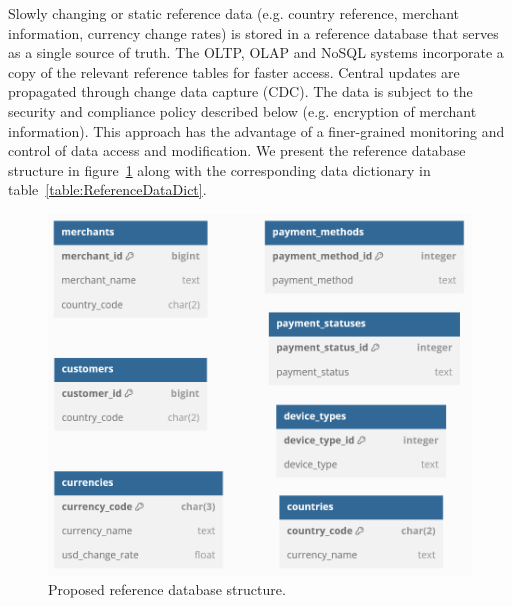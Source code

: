 \documentclass[11pt,a4paper,computermodern]{article}
\begin{document}
Slowly changing or static reference data (e.g. country reference, merchant information, currency change rates) is stored in a reference database that serves as a single source of truth. The OLTP, OLAP and NoSQL systems incorporate a copy of the relevant reference tables for faster access. Central updates are propagated through change data capture (CDC). The data is subject to the security and compliance policy described below (e.g. encryption of merchant information). This approach has the advantage of a finer-grained monitoring and control of data access and modification. We present the reference database structure in figure~\ref{fig:Reference} along with the corresponding data dictionary in table~\ref{table:ReferenceDataDict}.

\begin{figure}[!htb]
	\centering
	\includegraphics[scale=0.5]{./figures/Ref}
	\caption{Proposed reference database structure.}
	\label{fig:Reference}
\end{figure}
\end{document}
